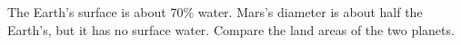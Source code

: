 The Earth's surface is about 70\% water. Mars's diameter
is about half the Earth's, but it has no surface water.
Compare the land areas of the two planets.\answercheck
